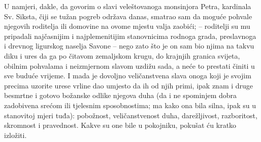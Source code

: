 \documentclass[a5paper,twoside]{article}
\begin{document}
U namjeri, dakle, da govorim o slavi veleštovanoga monsinjora Petra, kardinala Sv. Siksta, čiji se tužan pogreb održava danas, smatrao sam da moguće pohvale njegovih roditelja ili domovine na ovome mjestu valja zaobići;  – roditelji su mu  pripadali najčasnijim i najplemenitijim stanovnicima rodnoga grada, preslavnoga i drevnog ligurskog naselja Savone – nego zato što je on sam bio njima na takvu diku i ures da ga po čitavom zemaljskom krugu, do krajnjih granica svijeta, obilnim pohvalama i neizmjernom slavom uzdižu sada, a neće to prestati činiti u sve buduće vrijeme.  I mada je dovoljno veličanstvena slava onoga koji je svojim precima uzorite urese vrline dao umjesto da ih od njih primi, ipak znam i druge besmrtne i gotovo božanske odlike njegova duha (da i ne spominjem dobra zadobivena srećom ili tjelesnim sposobnostima; ma kako ona bila silna, ipak su u stanovitoj mjeri tuđa): pobožnost, veličanstvenost duha, darežljivost, razboritost, skromnost i pravednost.  Kakve su one bile u pokojniku, pokušat ću kratko izložiti.
\pend
\pstart
\end{document}
